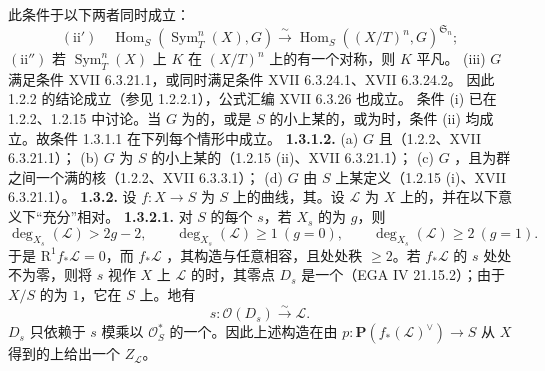 此条件于以下两者同时成立：
\[(\mathrm{ii}')\quad\operatorname{Hom}_S(\operatorname{Sym}^n_T(X),G)\xrightarrow\sim\operatorname{Hom}_S((X/T)^n,G)^{\mathfrak S_n};\]
$(\mathrm{ii}'')$ 若 $\operatorname{Sym}^n_T(X)$ 上 $K$ 在 $(X/T)^n$ 上的有一个对称，则 $K$ 平凡。
(iii) $G$ 满足条件 XVII 6.3.21.1，或同时满足条件 XVII 6.3.24.1、XVII 6.3.24.2。
因此 1.2.2 的结论成立（参见 1.2.2.1），公式汇编 XVII 6.3.26 也成立。
条件 (i) 已在 1.2.2、1.2.15 中讨论。当 $G$ 为的，或是 $S$ 的小上某的，或为时，条件 (ii) 均成立。故条件 1.3.1.1 在下列每个情形中成立。
\textbf{1.3.1.2.}
(a) $G$ 且（1.2.2、XVII 6.3.21.1）；
(b) $G$ 为 $S$ 的小上某的（1.2.15 (ii)、XVII 6.3.21.1）；
(c) $G$ ，且为群之间一个满的核（1.2.2、XVII 6.3.3.1）；
(d) $G$ 由 $S$ 上某定义（1.2.15 (i)、XVII 6.3.21.1）。
\textbf{1.3.2.} 设 $f:X\to S$ 为 $S$ 上的曲线，其。设 $\mathscr L$ 为 $X$ 上的，并在以下意义下“充分”相对。
\textbf{1.3.2.1.} 对 $S$ 的每个 $s$，若 $X_s$ 的为 $g$，则
\[\deg_{X_s}(\mathscr L)>2g-2,\qquad\deg_{X_s}(\mathscr L)\geq1\ (g=0),\qquad\deg_{X_s}(\mathscr L)\geq2\ (g=1).\]
于是 $\mathrm R^1f_*\mathscr L=0$，而 $f_*\mathscr L$ ，其构造与任意相容，且处处秩 $\geq2$。若 $f_*\mathscr L$ 的 $s$ 处处不为零，则将 $s$ 视作 $X$ 上 $\mathscr L$ 的时，其零点 $D_s$ 是一个（EGA IV 21.15.2）；由于 $X/S$ 的为 $1$，它在 $S$ 上。地有
\[s:\mathscr O(D_s)\xrightarrow\sim\mathscr L.\]
 $D_s$ 只依赖于 $s$ 模乘以 $\mathscr O_S^*$ 的一个。因此上述构造在由 $p:\mathbf P(f_*(\mathscr L)^\vee)\to S$ 从 $X$ 得到的上给出一个 $Z_{\mathscr L}$。

